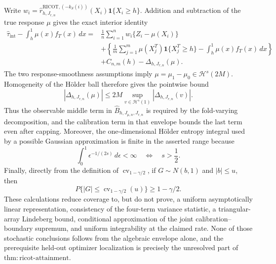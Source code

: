 Write \(w_i=\widehat r^{\mathrm{RICOT},(-k_S(i))}_{h,J_{r,n}}(X_i)\mathbf 1\{X_i\ge h\}\).  Addition and subtraction of the true response \(\mu\) gives the exact interior identity
\[
\begin{aligned}
\widehat\tau_{\mathrm{int}}-\int_h^1\mu(x)f_T(x)\,dx
={}&\frac1n\sum_{i=1}^nw_i\{Z_i-\mu(X_i)\}\\
&+\left\{\frac1m\sum_{j=1}^m\mu(X_j^T)\mathbf 1\{X_j^T\ge h\}-\int_h^1\mu(x)f_T(x)\,dx\right\}\\
&+C_{n,m}(h)-\Delta_{h,J_{r,n}}(\mu).
\end{aligned}
\]
The two response-smoothness assumptions imply \(\mu=\mu_1-\mu_0\in\mathcal H^s(2M)\).  Homogeneity of the H\"older ball therefore gives the pointwise bound
\[
|\Delta_{h,J_{r,n}}(\mu)|
\le 2M\sup_{v\in\mathcal H^s(1)}|\Delta_{h,J_{r,n}}(v)|.
\]
Thus the observable middle term in \(\widehat B_{h,J_{\mu,n},J_{r,n}}\) is required by the fold-varying decomposition, and the calibration term in that envelope bounds the last term even after capping.  Moreover, the one-dimensional H\"older entropy integral used by a possible Gaussian approximation is finite in the asserted range because
\[
\int_0^1\epsilon^{-1/(2s)}\,d\epsilon<\infty
\quad\Longleftrightarrow\quad s>\frac12.
\]
Finally, directly from the definition of \(\operatorname{cv}_{1-\gamma/2}\), if \(G\sim N(b,1)\) and \(|b|\le u\), then
\[
P\{|G|\le\operatorname{cv}_{1-\gamma/2}(u)\}\ge1-\gamma/2.
\]
These calculations reduce coverage to, but do not prove, a uniform asymptotically linear representation, consistency of the four-term variance statistic, a triangular-array Lindeberg bound, conditional approximation of the joint calibration--boundary supremum, and uniform integrability at the claimed rate.  None of those stochastic conclusions follows from the algebraic envelope alone, and the prerequisite held-out optimizer localization is precisely the unresolved part of \(\mathrm{thm:ricot\text{-}attainment}\).